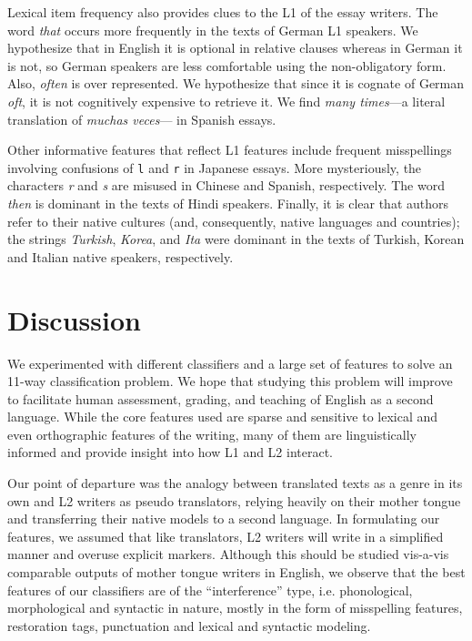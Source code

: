 \documentclass[11pt,letterpaper]{article}
\newcommand{\textnl}{\textsl}
\begin{document}
Lexical item frequency also provides clues to the L1 of the essay writers. The word \textnl{that} occurs more frequently in the texts of German
L1 speakers. We hypothesize that in English it is optional in relative
clauses whereas in German it is not, so German speakers are less comfortable using the non-obligatory form.  Also, \textnl{often} is
over represented. We hypothesize that since it is cognate of German \textnl{oft}, it is not
cognitively expensive to retrieve it. We find \textnl{many times}---a literal translation of \textnl{muchas veces}--- in Spanish essays.

Other informative features that reflect L1 features include frequent misspellings involving confusions of {\tt l} and {\tt r} in Japanese essays. More mysteriously, the characters \textnl{r} and \textnl{s} are misused in Chinese
and Spanish, respectively. The word \textnl{then} is dominant in the texts of
Hindi speakers. Finally, it is clear that authors refer to their
native cultures (and, consequently, native languages and countries);
the strings \textnl{Turkish}, \textnl{Korea}, and \textnl{Ita} were
dominant in the texts of Turkish, Korean and Italian native speakers,
respectively.

\section{Discussion}
\label{sec:discussion}

We experimented with different classifiers and a large set of features to solve an 11-way classification problem. We hope that studying this problem will improve to facilitate human assessment, grading, and teaching of English as a second language. While the core features used are sparse and sensitive to lexical and even orthographic features of the writing, many of them are linguistically informed and provide insight into how L1 and L2 interact.  

Our point of departure was the analogy between translated texts as a genre in its own and L2 writers as pseudo translators, relying heavily on their mother tongue and transferring their native models to a second language. In formulating our features, we assumed that like translators, L2 writers will write in a simplified manner and overuse explicit markers. Although this should be studied vis-a-vis comparable outputs of mother tongue writers in English, we observe that the best features of our classifiers are of the ``interference'' type, i.e. phonological, morphological and syntactic in nature, mostly in the form of misspelling features, restoration tags, punctuation and lexical and syntactic modeling.
\end{document}
